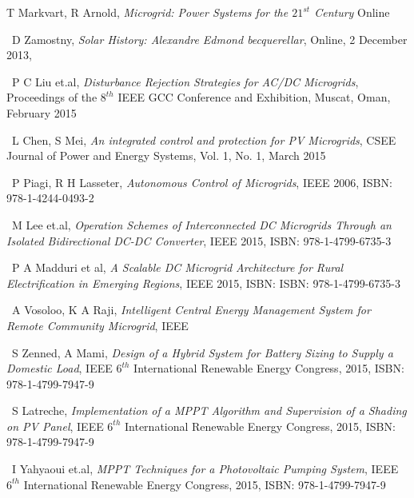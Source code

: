 \documentclass[journal,twoside]{IEEEtran}
\begin{document}
\begin{thebibliography}{99}

        T Markvart, R Arnold, 
        \emph{Microgrid: Power Systems for the $21^{st}$ Century} 
        \lbrack Online \rbrack [Available:http://www.ingenia.org.uk/ingenia/articles.aspx?Index=329]

        ~D Zamostny, \emph{Solar History: Alexandre Edmond
        becquerellar}, \lbrack Online\rbrack, 2 December 2013,

        ~P C Liu et.al, \emph{Disturbance Rejection Strategies
        for AC/DC Microgrids}, Proceedings of the $8^{th}$ 
        IEEE GCC Conference and Exhibition, Muscat,
        Oman, February 2015

        ~L Chen, S Mei, \emph{An integrated control and
        protection for PV Microgrids}, CSEE Journal of
        Power and Energy Systems, Vol. 1, No. 1, March
        2015

        ~P Piagi, R H Lasseter, \emph{Autonomous Control of
        Microgrids}, IEEE 2006, ISBN: 978-1-4244-0493-2

     ~M Lee et.al, \emph{Operation Schemes of
        Interconnected DC Microgrids Through an
        Isolated Bidirectional DC-DC Converter}, IEEE
        2015, ISBN: 978-1-4799-6735-3

        ~P A Madduri et al, \emph{A Scalable DC Microgrid
        Architecture for Rural Electrification in Emerging
        Regions}, IEEE 2015, ISBN: ISBN: 978-1-4799-6735-3

        ~A Vosoloo, K A Raji, \emph{Intelligent Central Energy
        Management System for Remote Community
        Microgrid}, IEEE

        ~S Zenned, A Mami, \emph{Design of a Hybrid System
        for Battery Sizing to Supply a Domestic Load},
        IEEE $6^{th}$ International Renewable Energy
        Congress, 2015, ISBN: 978-1-4799-7947-9
    
        ~S Latreche, \emph{Implementation of a MPPT
        Algorithm and Supervision of a Shading on PV
        Panel}, IEEE $6^{th}$ International Renewable Energy
        Congress, 2015, ISBN: 978-1-4799-7947-9

        ~I Yahyaoui et.al, \emph{MPPT Techniques for a
        Photovoltaic Pumping System}, IEEE $6^{th}$
        International Renewable Energy Congress, 2015,
        ISBN: 978-1-4799-7947-9


\end{thebibliography}
\end{document}
